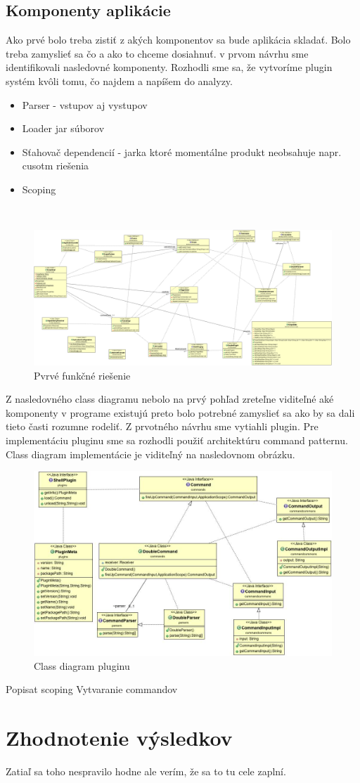 \subsection{Komponenty aplikácie}
\indent Ako prvé bolo treba zistiť z akých komponentov sa bude aplikácia skladať. Bolo treba zamyslieť sa čo a ako to chceme dosiahnuť. v prvom návrhu sme identifikovali nasledovné komponenty. Rozhodli sme sa, že vytvoríme plugin systém kvôli tomu, čo najdem a napíšem do analyzy.
\begin{itemize}
	\item Parser - vstupov aj vystupov
	\item Loader jar súborov
	\item Sťahovač dependencií - jarka ktoré momentálne produkt neobsahuje napr. cusotm riešenia
	\item Scoping
\end{itemize}

 \begin{figure}[!htbp]
	\centering
	\includegraphics[width=15cm]{img/first_attemp_class_diag.jpg}
	\caption{Pvrvé funkčné riešenie}
	\label{fig:test}
\end{figure}
\newline
Z nasledovného class diagramu nebolo na prvý pohľad zreteľne viditeľné aké komponenty v programe existujú preto bolo potrebné zamyslieť sa ako by sa dali tieto časti rozumne rodeliť. Z prvotného návrhu sme vytiahli plugin. Pre implementáciu pluginu sme sa rozhodli použiť architektúru command patternu. Class diagram implementácie je viditeľný na nasledovnom obrázku.
 \begin{figure}[!htbp]
	\centering
	\includegraphics[width=15cm]{img/plugin_class.jpg}
	\caption{Class diagram pluginu}
	\label{fig:test}
\end{figure}
\newline
Popisat scoping
Vytvaranie commandov

\section{Zhodnotenie výsledkov}
Zatiaľ sa toho nespravilo hodne ale verím, že sa to tu cele zaplní.